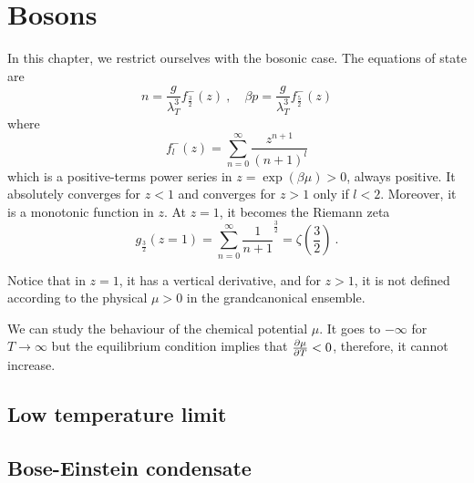 \chapter{Bosons}

    In this chapter, we restrict ourselves with the bosonic case. The equations of state are 
    \begin{equation*}
        n = \frac{g}{\lambda^3_T} f^-_{\frac{3}{2}} (z) ~, \quad \beta p = \frac{g}{\lambda^3_T} f^-_{\frac{5}{2}} (z)
    \end{equation*}
    where 
    \begin{equation*}
        f_l^- (z) = \sum_{n=0}^\infty \frac{z^{n+1}}{(n+1)^l}
    \end{equation*}
    which is a positive-terms power series in $z = \exp(\beta\mu) > 0$, always positive. It absolutely converges for $z < 1$ and converges for $z > 1$ only if $l < 2$. Moreover, it is a monotonic function in $z$. At $z = 1$, it becomes the Riemann zeta 
    \begin{equation*}
        g_{\frac{3}{2}} (z=1) = \sum_{n=0}^\infty \frac{1}{n+1}^{\frac{3}{2}} = \zeta(\frac{3}{2}) ~.
    \end{equation*}

    Notice that in $z = 1$, it has a vertical derivative, and for $z > 1$, it is not defined according to the physical $\mu > 0$ in the grandcanonical ensemble. 

    We can study the behaviour of the chemical potential $\mu$. It goes to $-\infty$ for $T \rightarrow \infty$ but the equilibrium condition implies that $\frac{\partial\mu}{\partial T} < 0$, therefore, it cannot increase. 

\section{Low temperature limit}

\section{Bose-Einstein condensate}

